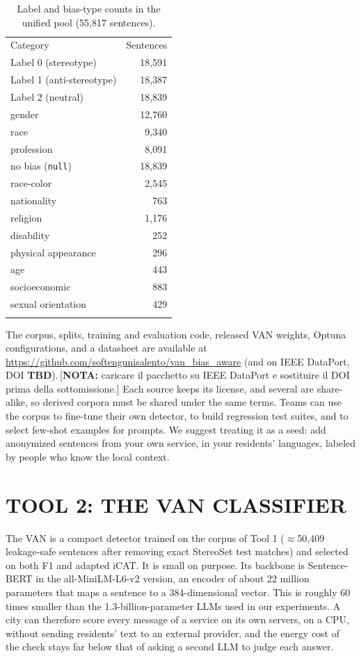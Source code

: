 \documentclass{IEEEcsmag}
\newif\ifshownotes \shownotestrue
\newcommand{\nota}[1]{\ifshownotes{\color{red}\,[\textbf{NOTA:} #1]}\fi}
\newcommand{\tbd}{\ifshownotes{\color{red}\textbf{TBD}}\else{ - }\fi}
\begin{document}
\begin{table}[t]
\caption{Label and bias-type counts in the unified pool (55,817 sentences).}
\label{tab:corpus-counts}
\centering
\tablefont
\setlength{\tabcolsep}{4pt}
\begin{tabular}{@{}lr@{}}
\toprule
Category & Sentences\\
\colrule
Label 0 (stereotype) & 18,591\\
Label 1 (anti-stereotype) & 18,387\\
Label 2 (neutral) & 18,839\\
\colrule
gender & 12,760\\
race & 9,340\\
profession & 8,091\\
no bias (\texttt{null}) & 18,839\\
race-color & 2,545\\
nationality & 763\\
religion & 1,176\\
disability & 252\\
physical appearance & 296\\
age & 443\\
socioeconomic & 883\\
sexual orientation & 429\\
\botrule
\end{tabular}
\end{table}

The corpus, splits, training and evaluation code, released VAN weights, Optuna configurations, and a datasheet are available at \url{https://github.com/softengunisalento/van_bias_aware} (and on IEEE DataPort, DOI \tbd).\nota{caricare il pacchetto su IEEE DataPort e sostituire il DOI prima della sottomissione.} Each source keeps its license, and several are share-alike, so derived corpora must be shared under the same terms. Teams can use the corpus to fine-tune their own detector, to build regression test suites, and to select few-shot examples for prompts. We suggest treating it as a seed: add anonymized sentences from your own service, in your residents' languages, labeled by people who know the local context.

\section{TOOL 2: THE VAN CLASSIFIER}

The VAN is a compact detector trained on the corpus of Tool 1 ($\approx$50{,}409 leakage-safe sentences after removing exact StereoSet test matches) and selected on both F1 and adapted iCAT. It is small on purpose. Its backbone is Sentence-BERT\cite{reimers2019} in the all-MiniLM-L6-v2 version, an encoder of about 22 million parameters that maps a sentence to a 384-dimensional vector. This is roughly 60 times smaller than the 1.3-billion-parameter LLMs used in our experiments. A city can therefore score every message of a service on its own servers, on a CPU, without sending residents' text to an external provider, and the energy cost of the check stays far below that of asking a second LLM to judge each answer.
\end{document}
